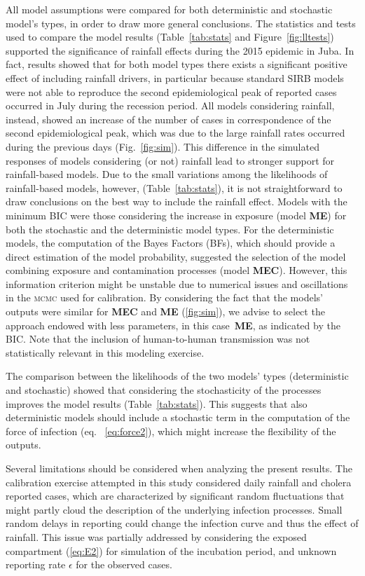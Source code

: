 All model assumptions were compared for both deterministic and stochastic model's types, in order to draw more general conclusions. The statistics and tests used to compare the model results  (Table~\ref{tab:stats} and Figure~\ref{fig:lltests}) supported the significance of rainfall effects during the 2015 epidemic in Juba. In fact, results showed that for both model types there exists a significant positive effect of including rainfall drivers, in particular because standard SIRB models were not able to reproduce the second epidemiological peak of reported cases occurred in July during the recession period. All models considering rainfall, instead, showed an increase of the number of cases in correspondence of the second epidemiological peak, which was due to the large rainfall rates occurred during the previous days (Fig.~\ref{fig:sim}). 
This difference in the simulated responses of models considering (or not) rainfall lead to stronger support for rainfall-based models. Due to the small variations among the likelihoods of rainfall-based models, however,  (Table~\ref{tab:stats}), it is not straightforward to draw conclusions on the best way to include the rainfall effect.
Models with the minimum BIC were those considering the increase in exposure (model \textbf{ME}) for both the stochastic and the deterministic model types. For the deterministic models, the computation of the Bayes Factors (BFs), which should provide a direct estimation of the model probability, suggested the selection of the model combining exposure and contamination processes (model \textbf{MEC}). However, this information criterion might be unstable due to numerical issues and oscillations in the \textsc{mcmc} used for calibration\cite{Raftery07}. By considering the fact that the models' outputs were similar for \textbf{MEC} and \textbf{ME} (\ref{fig:sim}), we advise to select the approach endowed with less parameters, in this case~\textbf{ME}, as indicated by the BIC. Note that the inclusion of human-to-human transmission was not statistically relevant in this modeling exercise.

The comparison between the likelihoods of the two models' types (deterministic and stochastic) showed that considering the stochasticity of the processes improves the model results (Table~\ref{tab:stats}). This suggests that also deterministic models should include a stochastic term in the computation of the force of infection (eq. ~\ref{eq:force2}), which might increase the flexibility of the outputs.

Several limitations should be considered when analyzing the present results. The calibration exercise attempted in this study considered daily rainfall and cholera reported cases, which are characterized by significant random fluctuations that might partly cloud the description of the underlying infection processes. 
Small random delays in reporting could change the infection curve and thus the effect of rainfall. This issue was partially addressed by considering the exposed compartment (\ref{eq:E2}) for simulation of the incubation period, and unknown reporting rate $\epsilon$ for the observed cases.

